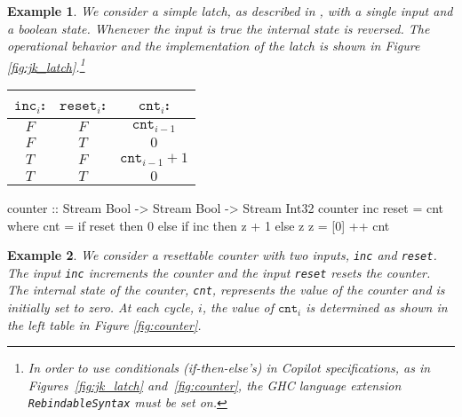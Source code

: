 \documentclass[]{article}
\theoremstyle{example}
\newtheorem{example}{Example}
\begin{document}
\begin{example}
We consider a simple latch, as described in \cite{Farhat2004}, with a single
input and a boolean state. Whenever the input is true the internal state is reversed.
The operational behavior and the implementation of the latch is shown in Figure
\ref{fig:jk_latch}.\footnote
{In order
to use conditionals (if-then-else's) in Copilot specifications,
as in Figures~\ref{fig:jk_latch} and~\ref{fig:counter}, the GHC
language extension {\tt RebindableSyntax} must be set on.}
\end{example}

\begin{figure*}
\begin{minipage}{0.4\linewidth}
\begin{tabular}{c|c||c}
$\mathtt{inc}_i$: & $\mathtt{reset}_i$: & $\mathtt{cnt}_i$: \\
\hline
$F$ & $F$ & $\mathtt{cnt}_{i-1}$ \\
\hline
$F$ & $T$ & $0$ \\
\hline
$T$ & $F$ & $\mathtt{cnt}_{i-1} + 1$ \\
\hline
$T$ & $T$ & $0$
\end{tabular}
\end{minipage}
\hspace{1cm}
\begin{minipage}{0.6\linewidth}
\begin{code}
counter :: Stream Bool -> Stream Bool 
        -> Stream Int32
counter inc reset = cnt
  where 
  cnt = if reset then 0
          else if inc then z + 1
                 else z
  z = [0] ++ cnt
\end{code}
\end{minipage}
\caption{A resettable counter. The specification is provided at the left and the
implementation is provided at the right.
}
\label{fig:counter}
\end{figure*}

\begin{example}
We consider a resettable counter with two inputs, {\tt inc} and {\tt reset}.
The input {\tt inc} increments the counter and the input {\tt reset} resets the
counter. The internal state of the counter, {\tt cnt}, represents the value of the
counter and is initially set to zero. At each cycle, $i$, the value of
$\mathtt{cnt}_i$ is determined as shown in the left table in Figure
\ref{fig:counter}.
\end{example}

\end{document}
